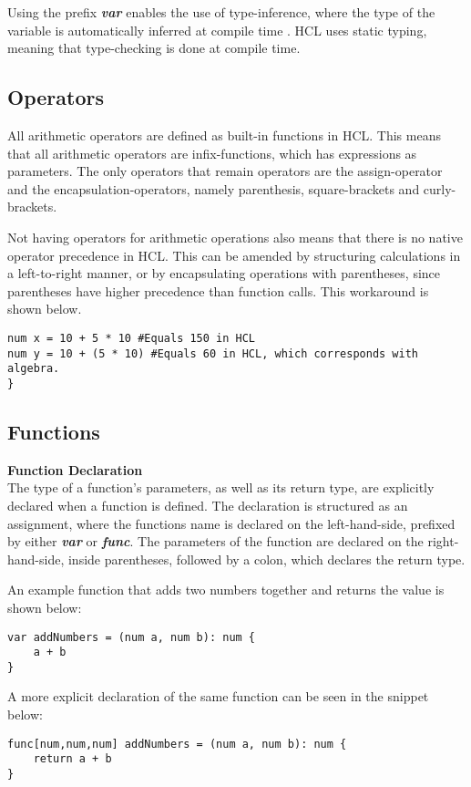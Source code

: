Using the prefix \textbf{\textit{var}} enables the use of type-inference, where the type of the variable is automatically inferred at compile time \cite{typeinf}.
HCL uses static typing, meaning that type-checking is done at compile time.

\subsection{Operators}
All arithmetic operators are defined as built-in functions in HCL.
This means that all arithmetic operators are infix-functions, which has expressions as parameters. 
The only operators that remain operators are the assign-operator and the encapsulation-operators, namely parenthesis, square-brackets and curly-brackets.

Not having operators for arithmetic operations also means that there is no native operator precedence in HCL.
This can be amended by structuring calculations in a left-to-right manner, or by encapsulating operations with parentheses, since parentheses have higher precedence than function calls. 
This workaround is shown below.

\begin{lstlisting}[language=HCL,firstnumber=1]
num x = 10 + 5 * 10 #Equals 150 in HCL
num y = 10 + (5 * 10) #Equals 60 in HCL, which corresponds with algebra.
}
\end{lstlisting}

\subsection{Functions}
\textbf{Function Declaration}\\
The type of a function's parameters, as well as its return type, are explicitly declared when a function is defined. 
The declaration is structured as an assignment, where the functions name is declared on the left-hand-side, prefixed by either \textbf{\textit{var}} or \textbf{\textit{func}}. 
The parameters of the function are declared on the right-hand-side, inside parentheses, followed by a colon, which declares the return type. 

An example function that adds two numbers together and returns the value is shown below:
\begin{lstlisting}[language=HCL,label=lis:addNumbers,firstnumber=1]
var addNumbers = (num a, num b): num {
    a + b
}
\end{lstlisting} 
A more explicit declaration of the same function can be seen in the snippet below:
\begin{lstlisting}[language=HCL,label=lis:hclExplicitTypeDcls,firstnumber=1]
func[num,num,num] addNumbers = (num a, num b): num {
	return a + b
}
\end{lstlisting}

